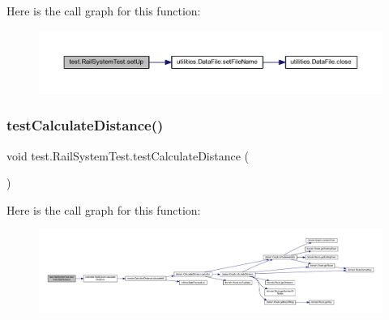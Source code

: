 Here is the call graph for this function\+:\nopagebreak
\begin{figure}[H]
\begin{center}
\leavevmode
\includegraphics[width=350pt]{classtest_1_1_rail_system_test_ab85936c259158b670fc1926bbe54fd2d_cgraph}
\end{center}
\end{figure}
\mbox{\label{classtest_1_1_rail_system_test_a5d1486af4e81c48f82549f1a57eff766}} 
\subsubsection{\texorpdfstring{test\+Calculate\+Distance()}{testCalculateDistance()}}
{\footnotesize\ttfamily void test.\+Rail\+System\+Test.\+test\+Calculate\+Distance (\begin{DoxyParamCaption}{ }\end{DoxyParamCaption})}

Here is the call graph for this function\+:\nopagebreak
\begin{figure}[H]
\begin{center}
\leavevmode
\includegraphics[width=350pt]{classtest_1_1_rail_system_test_a5d1486af4e81c48f82549f1a57eff766_cgraph}
\end{center}
\end{figure}
\mbox{\label{classtest_1_1_rail_system_test_a788f13f636cb5c25db513fff9fe8668b}} 
